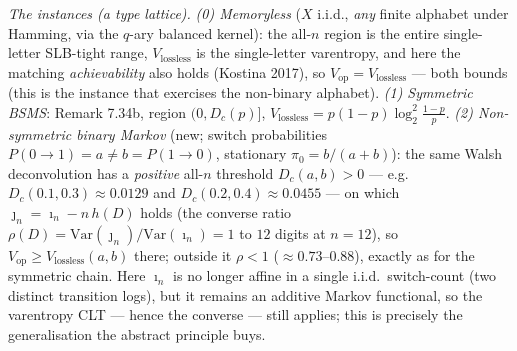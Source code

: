 \documentclass[
]{article}
\begin{document}
\emph{The instances (a type lattice).} \emph{(0) Memoryless} ($X$ i.i.d., \emph{any} finite alphabet
under Hamming, via the $q$-ary balanced kernel): the all-$n$ region is the entire single-letter
SLB-tight range, $V_{\mathrm{lossless}}$ is the single-letter varentropy, and here the matching
\emph{achievability} also holds (Kostina 2017), so $V_{\mathrm{op}}=V_{\mathrm{lossless}}$ --- both
bounds (this is the instance that exercises the non-binary alphabet). \emph{(1) Symmetric BSMS}: Remark 7.34b, region $(0,D_c(p)]$,
$V_{\mathrm{lossless}}=p(1-p)\log_2^2\tfrac{1-p}p$. \emph{(2) Non-symmetric binary Markov} (new; switch
probabilities $P(0\!\to\!1)=a\ne b=P(1\!\to\!0)$, stationary $\pi_0=b/(a+b)$): the same Walsh
deconvolution has a \emph{positive} all-$n$ threshold $D_c(a,b)>0$ --- e.g.\ $D_c(0.1,0.3)\approx0.0129$
and $D_c(0.2,0.4)\approx0.0455$ --- on which $\jmath_n=\imath_n-n\,h(D)$ holds (the converse ratio
$\rho(D)=\mathrm{Var}(\jmath_n)/\mathrm{Var}(\imath_n)=1$ to $12$ digits at $n=12$), so
$V_{\mathrm{op}}\ge V_{\mathrm{lossless}}(a,b)$ there; outside it $\rho<1$ ($\approx0.73$--$0.88$),
exactly as for the symmetric chain. Here $\imath_n$ is no longer affine in a single i.i.d.\ switch-count
(two distinct transition logs), but it remains an additive Markov functional, so the varentropy CLT ---
hence the converse --- still applies; this is precisely the generalisation the abstract principle buys.
\end{document}
